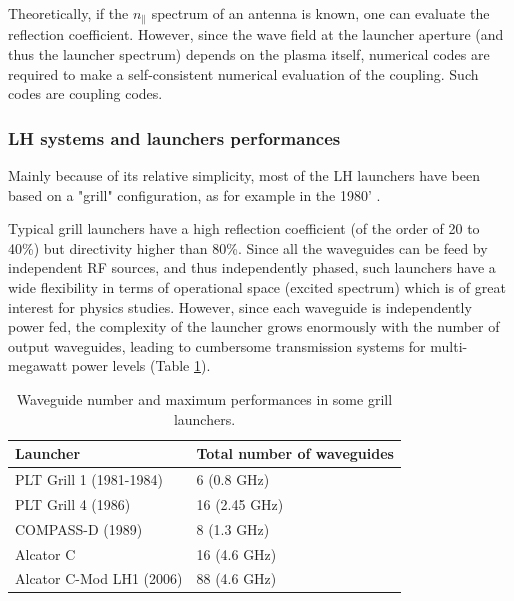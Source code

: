 Theoretically, if the $n_{\parallel}$ spectrum of an antenna is known, one can evaluate the reflection coefficient. However, since the wave field at the launcher aperture (and thus the launcher spectrum) depends on the plasma itself, numerical codes are required to make a self-consistent numerical evaluation of the coupling. Such codes are coupling codes.

\subsubsection{LH systems and launchers performances}
Mainly because of its relative simplicity, most of the LH launchers have been based on a "grill" configuration, as for example in the 1980' .

Typical grill launchers have a high reflection coefficient (of the order of 20 to 40\%) but directivity higher than 80\%. Since all the waveguides can be feed by independent RF sources, and thus independently phased, such launchers have a wide flexibility in terms of operational space (excited spectrum) which is of great interest for physics studies. However, since each waveguide is independently power fed, the complexity of the launcher grows enormously with the number of output waveguides, leading to cumbersome transmission systems for multi-megawatt power levels (Table \ref{tab:grillperformances}). 

\begin{table}
	{
		\begin{tabular}{| p{6cm} | p{5cm} |}
			\hline 
			Launcher & Total number of waveguides \\
			\hline \hline
			PLT Grill 1 (1981-1984)  \sidecite{stevens1988} & 6 (0.8 GHz) \\
			\hline
			PLT Grill 4 (1986) \sidecite{stevens1988} & 16 (2.45 GHz) \\
			\hline
			COMPASS-D (1989) & 8 (1.3 GHz) \\
			\hline
			Alcator C \sidecite{porkolab1984} & 16 (4.6 GHz) \\
			\hline
			Alcator C-Mod LH1 (2006) & 88 (4.6 GHz) \\
			\hline
		\end{tabular}
	}
	\caption{Waveguide number and maximum performances in some grill launchers.}
	\label{tab:grillperformances}
\end{table}

